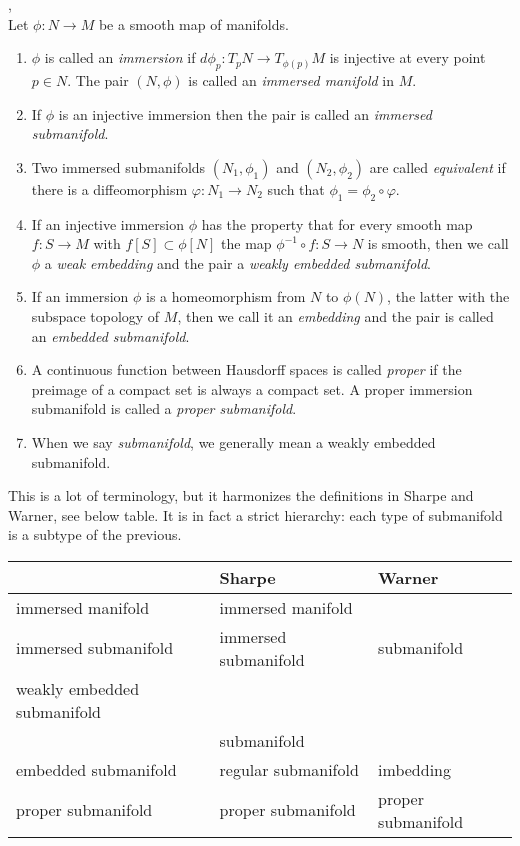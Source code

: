\begin{definition}\textup{\cite[Def~1.27, Rem~1.33]{Warner1983},\cite[Defs~1.1.36,~1.1.40,~1.2.10,~1.2.21]{Sharpe1997}} \\
Let $\phi : N \to M$ be a smooth map of manifolds.
\begin{enumerate}
\item 
$\phi$ is called an \emph{immersion} if $d\phi_p : T_pN \to T_{\phi(p)}M$ is injective at every point $p \in N$.
The pair $(N,\phi)$ is called an \emph{immersed manifold} in $M$.
\item
If $\phi$ is an injective immersion then the pair is called an \emph{immersed submanifold}.
\item 
Two immersed submanifolds $(N_1,\phi_1)$ and $(N_2,\phi_2)$ are called \emph{equivalent} if there is a diffeomorphism $\varphi : N_1 \to N_2$ such that $\phi_1 = \phi_2 \circ \varphi$.
\item
If an injective immersion $\phi$ has the property that for every smooth map $f: S \to M$ with $f[S] \subset \phi[N]$ the map $\phi^{-1} \circ f : S \to N$ is smooth, then we call $\phi$ a \emph{weak embedding} and the pair a \emph{weakly embedded submanifold}.
\item
If an immersion $\phi$ is a homeomorphism from $N$ to $\phi(N)$, the latter with the subspace topology of $M$, then we call it an \emph{embedding} and the pair is called an \emph{embedded submanifold}.
\item
A continuous function between Hausdorff spaces is called \emph{proper} if the preimage of a compact set is always a compact set.
A proper immersion submanifold is called a \emph{proper submanifold}.
\item
When we say \emph{submanifold}, we generally mean a weakly embedded submanifold.
\end{enumerate}
\end{definition}

This is a lot of terminology, but it harmonizes the definitions in Sharpe and Warner, see below table.
It is in fact a strict hierarchy: each type of submanifold is a subtype of the previous.

\begin{table}[h]
\begin{tabular}{l|l|l}
 & Sharpe & Warner \\ \hline
immersed manifold & immersed manifold & \\
immersed submanifold & immersed submanifold & submanifold \\
weakly embedded submanifold &  &  \\
 & submanifold &  \\
embedded submanifold & regular submanifold & imbedding \\
proper submanifold & proper submanifold & proper submanifold \\
\end{tabular}
\end{table}

